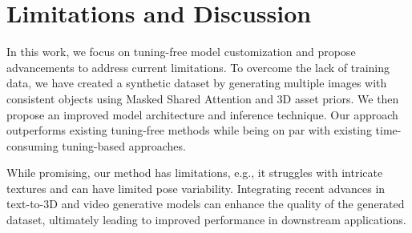 \section{Limitations and Discussion}
In this work, we focus on tuning-free model customization and propose advancements to address current limitations. To overcome the lack of training data, we have created a synthetic dataset by generating multiple images with consistent objects using Masked Shared Attention and 3D asset priors. We then propose an improved model architecture and inference technique. Our approach outperforms existing tuning-free methods while being on par with existing time-consuming tuning-based approaches. %

While promising, our method has limitations, e.g., it struggles with intricate textures and can have limited pose variability. Integrating recent advances in text-to-3D and video generative models can enhance the quality of the generated dataset, ultimately leading to improved performance in downstream applications.
